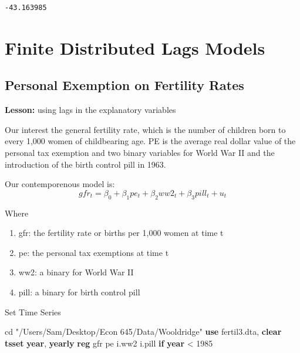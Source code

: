 \documentclass[
]{book}
\newenvironment{Shaded}{\begin{snugshade}}{\end{snugshade}}
\newcommand{\FunctionTok}[1]{\textcolor[rgb]{0.13,0.29,0.53}{\textbf{#1}}}
\newcommand{\KeywordTok}[1]{\textcolor[rgb]{0.13,0.29,0.53}{\textbf{#1}}}
\newcommand{\NormalTok}[1]{#1}
\newcommand{\StringTok}[1]{\textcolor[rgb]{0.31,0.60,0.02}{#1}}
\providecommand{\tightlist}{%
  \setlength{\itemsep}{0pt}\setlength{\parskip}{0pt}}
\begin{document}
\begin{verbatim}
-43.163985
\end{verbatim}

\chapter{Finite Distributed Lags Models}\label{finite-distributed-lags-models}

\section{Personal Exemption on Fertility Rates}\label{personal-exemption-on-fertility-rates}

\textbf{Lesson:} using lags in the explanatory variables

Our interest the general fertility rate, which is the number of children born
to every 1,000 women of childbearing age. PE is the average real dollar value
of the personal tax exemption and two binary variables for World War II and
the introduction of the birth control pill in 1963.

Our contemporenous model is:
\[ gfr_t=\beta_0 + \beta_1 pe_t + \beta_2 ww2_t + \beta_3 pill_t + u_t \]

Where

\begin{enumerate}
\def\labelenumi{\arabic{enumi}.}
\tightlist
\item
  gfr: the fertility rate or births per 1,000 women at time t
\item
  pe: the personal tax exemptions at time t
\item
  ww2: a binary for World War II
\item
  pill: a binary for birth control pill
\end{enumerate}

Set Time Series

\begin{Shaded}
\begin{Highlighting}[]
\NormalTok{cd }\StringTok{"/Users/Sam/Desktop/Econ 645/Data/Wooldridge"}
\KeywordTok{use}\NormalTok{ fertil3.dta, }\KeywordTok{clear}
\KeywordTok{tsset} \FunctionTok{year}\NormalTok{, }\FunctionTok{yearly}
\KeywordTok{reg}\NormalTok{ gfr pe i.ww2 i.pill }\KeywordTok{if} \FunctionTok{year}\NormalTok{ \textless{} 1985}
\end{Highlighting}
\end{Shaded}
\end{document}
